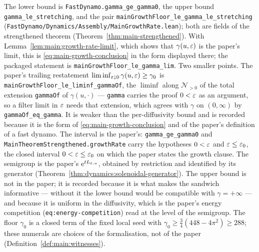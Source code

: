 The lower bound is \texttt{FastDynamo.gamma\_ge\_gamma0}, the upper bound
\texttt{gamma\_le\_stretching}, and the pair
\texttt{mainGrowthFloor\_le\_gamma\_le\_stretching}
(\texttt{FastDynamo/Dynamics/Assembly/MainGrowthRate.lean}); both are fields of
the strengthened theorem (Theorem~\ref{thm:main-strengthened}).  With
Lemma~\ref{lem:main:growth-rate-limit}, which shows that $\gamma(u,\varepsilon)$ is the paper's limit,
this is \eqref{eq:main-growth-conclusion} in the form displayed there; the packaged
statement is \texttt{mainGrowthFloor\_le\_gamma\_lim}.  Two smaller points.  The
paper's trailing restatement
$\liminf_{\varepsilon\downarrow0}\gamma(u,\varepsilon)\geq\gamma_0$ is
\texttt{mainGrowthFloor\_le\_liminf\_gammaOf}, the $\liminf$ along
$\mathcal N_{>0}$ of the total extension \texttt{gammaOf} of $\gamma(u,\cdot)$ ---
\texttt{gamma} carries the proof $0<\varepsilon$ as an argument, so a filter limit in $\varepsilon$ needs
that extension, which agrees with $\gamma$ on $(0,\infty)$ by
\texttt{gammaOf\_eq\_gamma}.  It is weaker than the per-diffusivity bound and is recorded
because it is the form of \eqref{eq:main-growth-conclusion} and of the paper's definition of
a fast dynamo.  The interval is the paper's: \texttt{gamma\_ge\_gamma0} and
\texttt{MainTheoremStrengthened.growthRate} carry the hypotheses $0<\varepsilon$ and
$\varepsilon\leq\varepsilon_0$, the closed interval $0<\varepsilon\leq\varepsilon_0$ on which the paper states the growth
clause.  The semigroup is the paper's $\mathrm{e}^{tL_{\varepsilon,u}}$, obtained by restriction and
identified by its generator (Theorem~\ref{thm:dynamics:solenoidal-generator}).  The upper bound is not in the
paper; it is
recorded because it is what makes the sandwich informative --- without it the
lower bound would be compatible with $\gamma=+\infty$ --- and because it is
uniform in the diffusivity, which is the paper's energy competition
(\texttt{eq:energy-competition}) read at the level of the semigroup.  The floor $\gamma_0$ is
a closed term of the fixed local seed with $\gamma_0\geq\tfrac34(448-4\pi^2)\geq288$; these
numerals are choices of the formalisation, not of the paper
(Definition~\ref{def:main:witnesses}).

